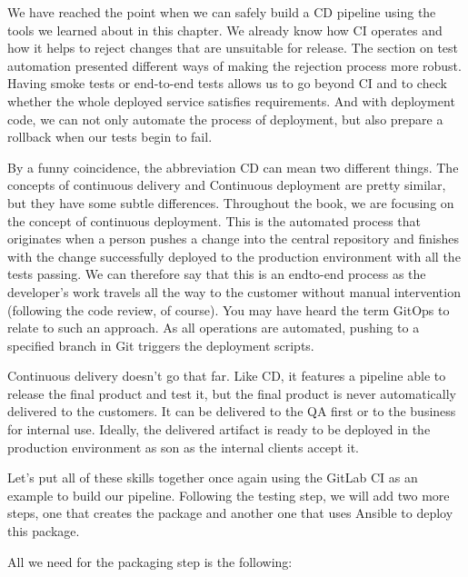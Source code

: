
We have reached the point when we can safely build a CD pipeline using the tools we learned about in this chapter. We already know how CI operates and how it helps to reject changes that are unsuitable for release. The section on test automation presented different ways of making the rejection process more robust. Having smoke tests or end-to-end tests allows us to go beyond CI and to check whether the whole deployed service satisfies requirements. And with deployment code, we can not only automate the process of deployment, but also prepare a rollback when our tests begin to fail.


By a funny coincidence, the abbreviation CD can mean two different things. The concepts of continuous delivery and Continuous deployment are pretty similar, but they have some subtle differences. Throughout the book, we are focusing on the concept of continuous deployment. This is the automated process that originates when a person pushes a change into the central repository and finishes with the change successfully deployed to the production environment with all the tests passing. We can therefore say that this is an endto-end process as the developer's work travels all the way to the customer without manual intervention (following the code review, of course). You may have heard the term GitOps to relate to such an approach. As all operations are automated, pushing to a specified branch in Git triggers the deployment scripts.

Continuous delivery doesn't go that far. Like CD, it features a pipeline able to release the final product and test it, but the final product is never automatically delivered to the customers. It can be delivered to the QA first or to the business for internal use. Ideally, the delivered artifact is ready to be deployed in the production environment as son as the internal clients accept it.


Let's put all of these skills together once again using the GitLab CI as an example to build our pipeline. Following the testing step, we will add two more steps, one that creates the package and another one that uses Ansible to deploy this package.

All we need for the packaging step is the following:

